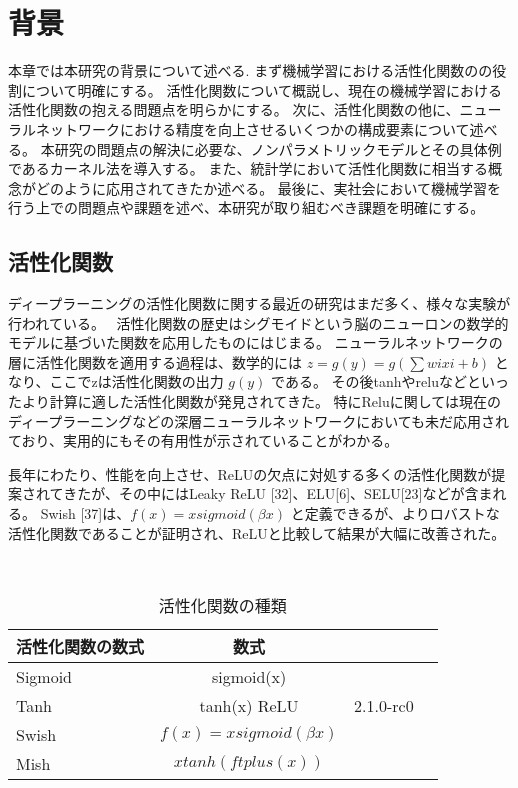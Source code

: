 \chapter{背景}
\label{background}

本章では本研究の背景について述べる.
まず機械学習における活性化関数のの役割について明確にする。
活性化関数について概説し、現在の機械学習における活性化関数の抱える問題点を明らかにする。
次に、活性化関数の他に、ニューラルネットワークにおける精度を向上させるいくつかの構成要素について述べる。
本研究の問題点の解決に必要な、ノンパラメトリックモデルとその具体例であるカーネル法を導入する。
また、統計学において活性化関数に相当する概念がどのように応用されてきたか述べる。
最後に、実社会において機械学習を行う上での問題点や課題を述べ、本研究が取り組むべき課題を明確にする。



\section{活性化関数}

ディープラーニングの活性化関数に関する最近の研究はまだ多く、様々な実験が 行われている。~\cite{study_af}
活性化関数の歴史はシグモイドという脳のニューロンの数学的モデルに基づいた関数を応用したものにはじまる。
ニューラルネットワークの層に活性化関数を適用する過程は、数学的には $ z=g(y)=g(\sum wixi+b) $ となり、ここでzは活性化関数の出力 $ g(y) $ である。
その後tanhやreluなどといったより計算に適した活性化関数が発見されてきた。
特にReluに関しては現在のディープラーニングなどの深層ニューラルネットワークにおいても未だ応用されており、実用的にもその有用性が示されていることがわかる。

長年にわたり、性能を向上させ、ReLUの欠点に対処する多くの活性化関数が提案されてきたが、その中にはLeaky ReLU [32]、ELU[6]、SELU[23]などが含まれる。
Swish [37]は、$ f(x)=xsigmoid(\beta x) $ と定義できるが、よりロバストな活性化関数であることが証明され、ReLUと比較して結果が大幅に改善された。

~\cite{Mish}~\cite{ReLU}~\cite{trend_af}~\cite{evo_af}~\cite{study_af}~\cite{parametric_af}~\cite{isotron}~\cite{efficient_sim}~\cite{lsim}~\cite{sim}~\cite{ichimura}~\cite{Evolving}~\cite{swish}~\cite{resnte}~\cite{sim}

\begin{table}[htbp]
    \caption{活性化関数の種類}
    \begin{tabular}{l*{2}{c}r}
    活性化関数の数式              & 数式 \\
    \hline
    Sigmoid            & sigmoid(x) \\
    Tanh               & tanh(x)
    ReLU        & 2.1.0-rc0 \\
    Swish           & $ f(x)= xsigmoid(\beta x) $ \\
    Mish           & $ xtanh(f t plus(x)) $ \\

    \end{tabular}
\end{table}




